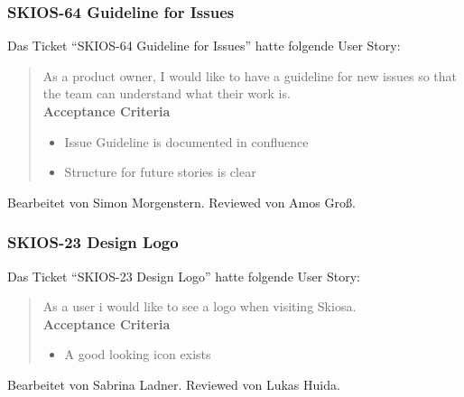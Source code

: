 \subsubsection{SKIOS-64 Guideline for Issues}
Das Ticket \enquote{SKIOS-64 Guideline for Issues} hatte folgende User Story:
\begin{quotation}
    As a product owner, I would like to have a guideline for new issues so that the team can understand what their work is. \\
\textbf{Acceptance Criteria}
\begin{itemize}
    \item Issue Guideline is documented in confluence
    \item Structure for future stories is clear
\end{itemize}
\end{quotation}
Bearbeitet von Simon Morgenstern.
Reviewed von Amos Groß.

\subsubsection{SKIOS-23 Design Logo}
Das Ticket \enquote{SKIOS-23 Design Logo} hatte folgende User Story:
\begin{quotation}
    As a user i would like to see a logo when visiting Skiosa. \\
    \textbf{Acceptance Criteria}
    \begin{itemize}
        \item A good looking icon exists
    \end{itemize}
\end{quotation}
Bearbeitet von Sabrina Ladner.
Reviewed von Lukas Huida.

